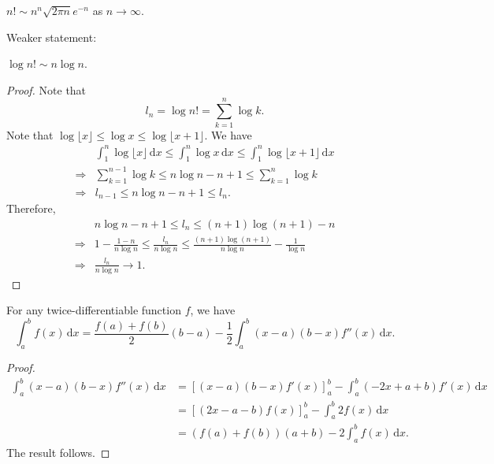 \begin{theorem}[Stirling]\label{thm:stirling}
    $ n! \sim n^n \sqrt{2\pi n}e^{-n} $ as $n\to \infty$.
\end{theorem}

Weaker statement:
\begin{proposition}\label{prop:weak stirling}
    $ \log n! \sim n \log n $.
\end{proposition}
\begin{proof}
    Note that 
    \[
        l_n = \log n! = \sum_{k=1}^{n}\log k.
    \]
    Note that $ \log \lfloor x \rfloor \le \log x \le \log \lfloor x+1 \rfloor $. We have 
    \begin{align*}
        & \int_{1}^{n} \log \lfloor x \rfloor \,\mathrm{d}x \le \int_{1}^{n} \log x \,\mathrm{d}x \le \int_{1}^{n} \log \lfloor x+1 \rfloor \,\mathrm{d}x\\ 
        \Longrightarrow & \sum_{k=1}^{n-1}\log k\le n\log n-n+1\le \sum_{k=1}^{n} \log k\\ 
        \Longrightarrow & l_{n-1}\le n\log n-n+1\le l_n.
    \end{align*}
    Therefore, 
    \begin{align*}
        &n\log n-n+1\le l_n\le (n+1) \log (n+1) -n \\ 
        \Longrightarrow& 1- \frac{1-n}{n\log n}\le \frac{l_n}{n\log n}\le \frac{(n+1) \log (n+1)}{n\log n}-\frac{1}{\log n}\\ 
        \Longrightarrow & \frac{l_n}{n\log n} \to 1.
    \end{align*}
\end{proof}

\begin{lemma}\label{lma:stirling1}
    For any twice-differentiable function $f$, we have 
    \[
        \int_{a}^{b} f(x) \,\mathrm{d}x = \frac{f(a)+f(b)}{2}(b-a) - \frac{1}{2} \int_{a}^{b} (x-a)(b-x)f''(x) \,\mathrm{d}x.
    \]
\end{lemma}

\begin{proof}
    \begin{align*}
        \int_{a}^{b} (x-a)(b-x)f''(x) \,\mathrm{d}x &= \left[ (x-a)(b-x)f'(x) \right]_{a}^{b} - \int_{a}^{b} (-2x+a+b) f'(x) \,\mathrm{d}x\\ 
        &= \left[ (2x-a-b)f(x) \right]_{a}^{b} - \int_{a}^{b} 2f(x) \,\mathrm{d}x\\ 
        &= (f(a)+f(b))(a+b) - 2 \int_{a}^{b} f(x) \,\mathrm{d}x.
    \end{align*}
    The result follows.
\end{proof}

